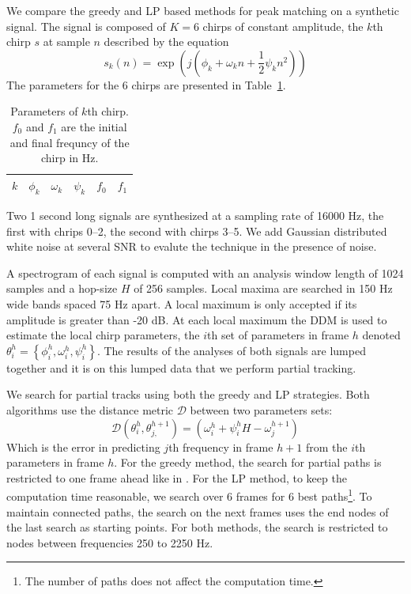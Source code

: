 We compare the greedy and LP based methods for peak matching on a synthetic
signal. The signal is composed of $K=6$ chirps of constant amplitude, the $k$th
chirp $s$ at sample $n$ described by the equation
\[
    s_{k}(n) = \exp(j(\phi_{k} + \omega_{k}n +
    \frac{1}{2} \psi_{k} n^{2}))
\]
The parameters for the 6 chirps are presented in
Table~\ref{tab:ptrackexamplechirpparams}.
\begin{table}
    \caption{Parameters of $k$th chirp. $f_{0}$ and $f_{1}$ are the initial and
    final frequncy of the chirp in Hz. \label{tab:ptrackexamplechirpparams}}
    \begin{center}
        \begin{tabular}{l c c c c c}
            $k$ & $\phi_{k}$ & $\omega_{k}$ & $\psi_{k}$ & $f_{0}$ & $f_{1}$ \\
            \hline
            
        \end{tabular}
    \end{center}
\end{table}

Two 1 second long signals are synthesized at a sampling rate of 16000 Hz, the
first with chrips 0--2, the second with chirps 3--5. We add
Gaussian distributed white noise at several SNR to evalute the technique in the
presence of noise.

A spectrogram of each signal is computed with an analysis window length of 1024
samples and a hop-size $H$ of 256 samples. Local maxima are searched in 150 Hz
wide bands spaced 75 Hz apart. A local maximum is only accepted if its amplitude
is greater than -20 dB. At each local maximum the DDM is used to estimate the
local chirp parameters, the $i$th set of parameters in frame $h$ denoted
$\theta_{i}^{h} = \left\{ \phi_{i}^{h} , \omega_{i}^{h} , \psi_{i}^{h}
\right\}$. The results of the analyses of both signals are lumped together and
it is on this lumped data that we perform partial tracking.

We search for partial tracks using both the greedy and LP strategies. Both
algorithms use the distance metric $\mathcal{D}$ between two parameters sets:
\[
    \mathcal{D} \left( \theta_{i}^{h},
    \theta_{j,}^{h+1} \right) = \left( \omega_{i}^{h} +
    \psi_{i}^{h} H - \omega_{j}^{h+1} \right)
\]
Which is the error in predicting $j$th frequency in frame $h+1$ from the $i$th
parameters in frame $h$. For the greedy method, the search for partial paths is
restricted to one frame ahead like in \cite{mcaulay1986speech}. For the LP
method, to keep the computation time reasonable, we search over 6 frames for 6
best paths\footnote{The number of paths does not affect the computation time.}.
To maintain connected paths, the search on the next frames uses the end nodes of
the last search as starting points. For both methods, the search is restricted
to nodes between frequencies 250 to 2250 Hz.

